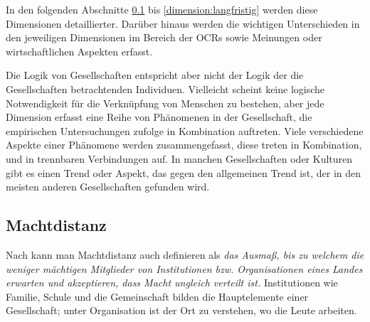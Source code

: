 In den folgenden Abschnitte \ref{dimension:machtdistanz} bis \ref{dimension:langfristig} werden diese Dimensionen detaillierter. Darüber hinaus werden die wichtigen Unterschieden in den jeweiligen Dimensionen im Bereich der \ac{OCRs} sowie Meinungen oder wirtschaftlichen Aspekten erfasst. 

Die Logik von Gesellschaften entspricht aber nicht der Logik der die Gesellschaften betrachtenden Individuen. Vielleicht scheint keine logische Notwendigkeit für die Verknüpfung von Menschen zu bestehen, aber jede Dimension erfasst eine Reihe von Phänomenen in der Gesellschaft, die empirischen Untersuchungen zufolge in Kombination auftreten. Viele verschiedene Aspekte einer Phänomene werden zusammengefasst, diese treten in Kombination, und in trennbaren Verbindungen auf. In manchen Gesellschaften oder Kulturen gibt es einen Trend oder Aspekt, das gegen den allgemeinen Trend ist, der in den meisten anderen Gesellschaften gefunden wird.\citep[p. ~29]{hofstede2013interkulturelle}
\subsection{Machtdistanz} \label{dimension:machtdistanz}
Nach \citet{hofstede2013interkulturelle} kann man Machtdistanz auch definieren als \emph{das Ausmaß, bis zu welchem die weniger mächtigen Mitglieder von Institutionen \ac{bzw.} Organisationen eines Landes erwarten und akzeptieren, dass Macht ungleich verteilt ist.} Institutionen wie Familie, Schule und die Gemeinschaft bilden die Hauptelemente einer Gesellschaft; unter Organisation ist der Ort zu verstehen, wo die Leute arbeiten. \citep[p. ~42]{hofstede2013interkulturelle}

